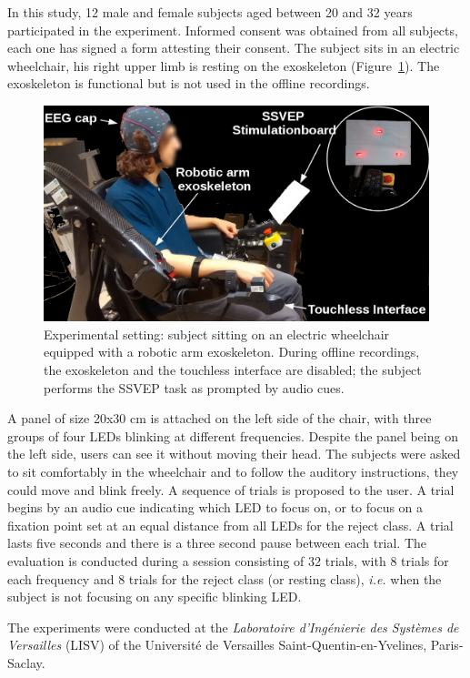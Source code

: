 In this study, 12 male and female subjects aged between 20 and 32 years participated in the experiment. 
Informed consent was obtained from all subjects, each one has signed a form attesting their consent. 
The subject sits in an electric wheelchair, his right upper limb is resting on the exoskeleton (Figure~\ref{fig:esta-expe-setup}). 
The exoskeleton is functional but is not used in the offline recordings.

\begin{figure}[!t]
    \centering
    \includegraphics[width=0.8\columnwidth]{Figures/esta-expe}
    \caption{Experimental setting: subject sitting on an electric wheelchair equipped with a robotic arm exoskeleton. During offline recordings, the exoskeleton and the touchless interface are disabled; the subject performs the SSVEP task as prompted by audio cues.}
    \label{fig:esta-expe-setup}
\end{figure}

A panel of size 20x30 cm is attached on the left side of the chair, with three groups of four LEDs blinking at different frequencies. 
Despite the panel being on the left side, users can see it without moving their head. 
The subjects were asked to sit comfortably in the wheelchair and to follow the auditory instructions, they could move and blink freely.
A sequence of trials is proposed to the user. 
A trial begins by an audio cue indicating which LED to focus on, or to focus on a fixation point set at an equal distance from all LEDs for the reject class. 
A trial lasts five seconds and there is a three second pause between each trial. 
The evaluation is conducted during a session consisting of 32 trials, with 8 trials for each frequency and 8 trials for the reject class (or resting class), \textit{i.e.} when the subject is not focusing on any specific blinking LED.

The experiments were conducted at the \emph{Laboratoire d'Ing\'{e}nierie des Syst\`{e}mes de Versailles} (LISV) of the Universit\'{e} de Versailles Saint-Quentin-en-Yvelines, Paris-Saclay. 

